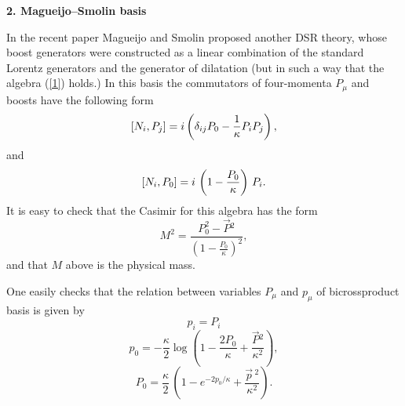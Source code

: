 \documentclass [prd,twocolumn,nofootinbib,showpacs]  {revtex4}
\begin{document}
\noindent
\textbf{ 2. Magueijo--Smolin basis}
\newline

In the recent paper \cite{JoaoLee} Magueijo and Smolin proposed
another DSR theory, whose boost  generators were constructed as a
linear combination of the standard Lorentz generators and the
generator of dilatation (but in such a way that the algebra
(\ref{1}) holds.) In this basis the commutators of four-momenta
$P_\mu$ and boosts have the following form
\begin{equation}\label{10}
   \left[N_{i}, P_{j}\right] =  i\left( \delta_{ij}P_0 -
  {1\over \kappa} P_{i}P_{j} \right),
\end{equation}
and
\begin{equation}\label{11}
  \left[N_{i},P_{0}\right] = i\, \left( 1 - {P_0\over \kappa}\right)\,P_{i}.
\end{equation}
It is easy to check that the Casimir for this algebra has the form
\begin{equation}\label{12}
 M^2 = \frac{P_{0}^2 - \vec{P}{}^2}{\left(1- \frac{P_0}\kappa\right)^2},
\end{equation}
and that $M$ above is the physical mass.

One
easily checks that the relation between variables $P_\mu$ and
$p_\mu$ of bicrossproduct basis is given by
\begin{equation}\label{13}
p_{i} = P_{i}
\end{equation}
$$
p_0 = - \frac\kappa2\log\left(1 - \frac{2P_0}{\kappa} + \frac{\vec{P}{}^2}{\kappa^2}\right),
$$
\begin{equation}\label{14}
 P_0 = \frac\kappa2\,\left(1 -  e^{-2p_0/\kappa} + \frac{\vec{p}\,{}^2}{\kappa^2}\right).
\end{equation}
\end{document}
